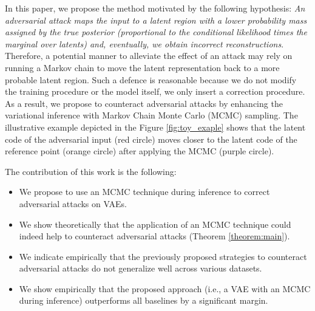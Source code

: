 In this paper, we propose the method motivated by the following hypothesis: \textit{An adversarial attack maps the input to a latent region with a lower probability mass assigned by the true posterior (proportional to the conditional likelihood times the marginal over latents) and, eventually, we obtain incorrect reconstructions}. 
Therefore, a potential manner to alleviate the effect of an attack may rely on running a Markov chain to move the latent representation back to a more probable latent region. 
Such a defence is reasonable because we do not modify the training procedure or the model itself, we only insert a correction procedure. As a result, we propose to counteract adversarial attacks by enhancing the variational inference with Markov Chain Monte Carlo (MCMC) sampling. 
The illustrative example depicted in the Figure \ref{fig:toy_exaple} shows that the latent code of the adversarial input (red circle) moves closer to the latent code of the reference point (orange circle) after applying the MCMC (purple circle). 


The contribution of this work is the following:
\begin{itemize}%
    \item We propose to use an MCMC technique during inference to correct adversarial attacks on VAEs.
    \item We show theoretically that the application of an MCMC technique could indeed help to counteract adversarial attacks (Theorem \ref{theorem:main}).
    \item We indicate empirically that the previously proposed strategies to counteract adversarial attacks do not generalize well across various datasets.
    \item We show empirically that the proposed approach (i.e., a VAE with an MCMC during inference) outperforms all baselines by a significant margin.
\end{itemize}

